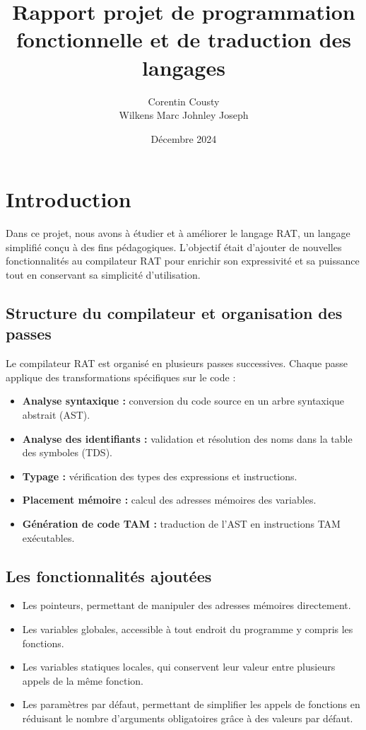 \documentclass[a4paper,12pt]{article}
\title{Rapport projet de programmation fonctionnelle et de traduction des langages}
\author{Corentin Cousty \\ Wilkens Marc Johnley Joseph}
\date{D\'ecembre 2024}
\begin{document}
\maketitle
\tableofcontents
\newpage

\section{Introduction}
Dans ce projet, nous avons \`a \'etudier et \`a am\'eliorer le langage RAT, un langage simplifi\'e con\c{c}u à des fins p\'edagogiques. L'objectif \'etait d'ajouter de nouvelles fonctionnalit\'es au compilateur RAT pour enrichir son expressivit\'e et sa puissance tout en conservant sa simplicit\'e d'utilisation.


\subsection{Structure du compilateur et organisation des passes}
Le compilateur RAT est organis\'e en plusieurs passes successives. Chaque passe applique des transformations sp\'ecifiques sur le code :
\begin{itemize}
    \item \textbf{Analyse syntaxique :} conversion du code source en un arbre syntaxique abstrait (AST).
    \item \textbf{Analyse des identifiants :} validation et r\'esolution des noms dans la table des symboles (TDS).
    \item \textbf{Typage :} v\'erification des types des expressions et instructions.
    \item \textbf{Placement m\'emoire :} calcul des adresses m\'emoires des variables.
    \item \textbf{G\'en\'eration de code TAM :} traduction de l'AST en instructions TAM ex\'ecutables.
\end{itemize}

\subsection{Les fonctionnalit\'es ajout\'ees}
\begin{itemize}
    \item Les pointeurs, permettant de manipuler des adresses m\'emoires directement.
    \item Les variables globales, accessible \`a tout endroit du programme y compris les fonctions.
    \item Les variables statiques locales, qui conservent leur valeur entre plusieurs appels de la m\^eme fonction.
    \item Les param\`etres par d\'efaut, permettant de simplifier les appels de fonctions en r\'eduisant le nombre d'arguments obligatoires grâce à des valeurs par défaut.
\end{itemize}
\end{document}
